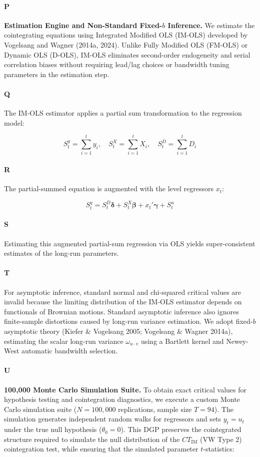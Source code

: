 \paragraph{P}
\textbf{Estimation Engine and Non-Standard Fixed-$b$ Inference.} We estimate the cointegrating equations using Integrated Modified OLS (IM-OLS) developed by Vogelsang and Wagner (2014a, 2024). Unlike Fully Modified OLS (FM-OLS) or Dynamic OLS (D-OLS), IM-OLS eliminates second-order endogeneity and serial correlation biases without requiring lead/lag choices or bandwidth tuning parameters in the estimation step.

\paragraph{Q}
The IM-OLS estimator applies a partial sum transformation to the regression model:

\[S_t^y = \sum_{i=1}^t y_i, \quad S_t^X = \sum_{i=1}^t X_i, \quad S_t^D = \sum_{i=1}^t D_i\]

\paragraph{R}
The partial-summed equation is augmented with the level regressors $x_t$:

\[S_t^y = S_t^D \boldsymbol{\delta} + S_t^X \boldsymbol{\beta} + x_t' \boldsymbol{\gamma} + S_t^u\]

\paragraph{S}
Estimating this augmented partial-sum regression via OLS yields super-consistent estimates of the long-run parameters.

\paragraph{T}
For asymptotic inference, standard normal and chi-squared critical values are invalid because the limiting distribution of the IM-OLS estimator depends on functionals of Brownian motions. Standard asymptotic inference also ignores finite-sample distortions caused by long-run variance estimation. We adopt fixed-$b$ asymptotic theory (Kiefer \& Vogelsang 2005; Vogelsang \& Wagner 2014a), estimating the scalar long-run variance $\omega_{u \cdot v}$ using a Bartlett kernel and Newey-West automatic bandwidth selection.

\paragraph{U}
\textbf{100,000 Monte Carlo Simulation Suite.} To obtain exact critical values for hypothesis testing and cointegration diagnostics, we execute a custom Monte Carlo simulation suite ($N = 100,000$ replications, sample size $T = 94$). The simulation generates independent random walks for regressors and sets $y_t = u_t$ under the true null hypothesis ($\theta_0 = 0$). This DGP preserves the cointegrated structure required to simulate the null distribution of the $CT_{\text{IM}}$ (VW Type 2) cointegration test, while ensuring that the simulated parameter $t$-statistics:

